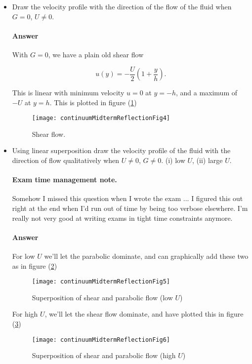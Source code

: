 \begin{itemize}
\item Draw the velocity profile with the direction of the flow of the fluid when $G = 0$, $U \ne 0$.

\paragraph{Answer}

With $G = 0$, we have a plain old shear flow

\begin{equation}\label{eqn:continuumMidTermReflection:670}
u(y) = - \frac{U}{2} \left( 1 + \frac{y}{h} \right).
\end{equation}

This is linear with minimum velocity $u = 0$ at $y = -h$, and a maximum of $-U$ at $y = h$.  This is plotted in figure (\ref{fig:continuumMidtermReflection:continuumMidtermReflectionFig4})
\begin{figure}[htp]
   \centering
   \texttt{[image: continuumMidtermReflectionFig4]}
   \caption{Shear flow.}\label{fig:continuumMidtermReflection:continuumMidtermReflectionFig4}
\end{figure}

\item Using linear superposition draw the velocity profile of the fluid with the direction of flow qualitatively when $U \ne 0$, $G \ne 0$. (i) low $U$, (ii) large $U$.
\paragraph{Exam time management note.} Somehow I missed this question when I wrote the exam ... I figured this out right at the end when I'd run out of time by being too verbose elsewhere.  I'm really not very good at writing exams in tight time constraints anymore.

\paragraph{Answer}

For low $U$ we'll let the parabolic dominate, and can graphically add these two as in figure (\ref{fig:continuumMidtermReflection:continuumMidtermReflectionFig5})
\begin{figure}[htp]
   \centering
   \texttt{[image: continuumMidtermReflectionFig5]}
   \caption{Superposition of shear and parabolic flow (low $U$)}\label{fig:continuumMidtermReflection:continuumMidtermReflectionFig5}
\end{figure}
For high $U$, we'll let the shear flow dominate, and have plotted this in figure (\ref{fig:continuumMidtermReflection:continuumMidtermReflectionFig6})
\begin{figure}[htp]
   \centering
   \texttt{[image: continuumMidtermReflectionFig6]}
   \caption{Superposition of shear and parabolic flow (high $U$)}\label{fig:continuumMidtermReflection:continuumMidtermReflectionFig6}
\end{figure}


\end{itemize}
